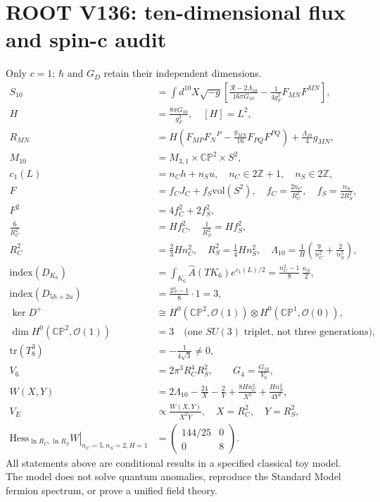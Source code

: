 \documentclass[11pt]{article}
\begin{document}
\section*{ROOT V136: ten-dimensional flux and spin-c audit}
\noindent Only $c=1$; $\hbar$ and $G_D$ retain their independent dimensions.
\begin{align}
S_{10}&=\int d^{10}X\sqrt{-g}\left[\frac{\mathcal R-2\Lambda_{10}}{16\pi G_{10}}-\frac1{4g_F^2}F_{MN}F^{MN}\right], \\
H&=\frac{8\pi G_{10}}{g_F^2},\quad [H]=L^2,\\
R_{MN}&=H\left(F_{MP}F_N{}^P-\frac{g_{MN}}{16}F_{PQ}F^{PQ}\right)+\frac{\Lambda_{10}}4g_{MN},\\
M_{10}&=M_{3,1}\times\mathbb{CP}^2\times S^2,\\
c_1(L)&=n_Ch+n_Su,\quad n_C\in 2\mathbb Z+1,\quad n_S\in 2\mathbb Z,\\
F&=f_CJ_C+f_S\mathrm{vol}(S^2),\quad f_C=\frac{2n_C}{R_C^2},\quad f_S=\frac{n_S}{2R_S^2},\\
F^2&=4f_C^2+2f_S^2,\\
\frac6{R_C^2}&=Hf_C^2,\quad \frac1{R_S^2}=Hf_S^2,\\
R_C^2&=\frac23Hn_C^2,\quad R_S^2=\frac14Hn_S^2,\quad
\Lambda_{10}=\frac1H\left(\frac9{n_C^2}+\frac2{n_S^2}\right),\\
\mathrm{index}(D_{K_6})&=\int_{K_6}\widehat A(TK_6)e^{c_1(L)/2}
=\frac{n_C^2-1}{8}\,\frac{n_S}{2},\\
\mathrm{index}(D_{5h+2u})&=\frac{25-1}{8}\cdot 1=3,\\
\ker D^+&\cong H^0(\mathbb{CP}^2,\mathcal O(1))\otimes H^0(\mathbb{CP}^1,\mathcal O(0)),\\
\dim H^0(\mathbb{CP}^2,\mathcal O(1))&=3\quad\text{(one $SU(3)$ triplet, not three generations)},\\
\mathrm{tr}(T_8^3)&=-\frac1{4\sqrt3}\neq0,\\
V_6&=2\pi^3R_C^4R_S^2,\qquad G_4=\frac{G_{10}}{V_6},\\
W(X,Y)&=2\Lambda_{10}-\frac{24}{X}-\frac2Y+\frac{8Hn_C^2}{X^2}+\frac{Hn_S^2}{4Y^2},\\
V_E&\propto\frac{W(X,Y)}{X^2Y},\quad X=R_C^2,\quad Y=R_S^2,\\
\left.\mathrm{Hess}_{\ln R_C,\ln R_S}W\right|_{n_C=5,n_S=2,H=1}
&=\begin{pmatrix}144/25&0\\0&8\end{pmatrix}.
\end{align}
\noindent All statements above are conditional results in a specified classical toy model.
The model does not solve quantum anomalies, reproduce the Standard Model fermion spectrum,
or prove a unified field theory.
\end{document}

